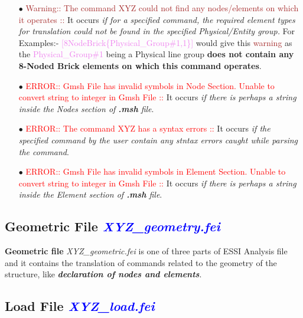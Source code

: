 \documentclass[11pt]{article}
\begin{document}
\begin{itemize}
  \item[$\bullet$]  \textcolor{brown}{Warning::  The  command  XYZ could not
  find any nodes/elements on which it operates :: } 
  It occurs \textit{if for
  a  specified command, the required element types for translation could not
  be   found   in  the  specified  Physical/Entity  group.}  For  Examples:-
  \textcolor{violet}{[8NodeBrick\{Physical\_Group\#1,1\}]}  would  give this
  \textcolor{brown}{warning}  as  the \textcolor{violet}{Physical\_Group\#1}
  being  a  Physical  line  group \textbf{does not contain any 8-Noded Brick
  elements on which this command operates}.
  
  \item[$\bullet$]  \textcolor{red}{ERROR:: Gmsh File has invalid symbols in
  Node  Section.  Unable  to  convert string to integer in Gmsh File :: } 
  It
  occurs  \textit{if  there  is perhaps a string inside the Nodes section of
  \textbf{.msh} file}.
  
  \item[$\bullet$]  \textcolor{red}{ERROR::  The  command  XYZ  has a syntax
  errors :: } 
  It occurs \textit{if the specified command by the user contain
  any stntax errors caught while parsing the command}.
  
  \item[$\bullet$]  \textcolor{red}{ERROR:: Gmsh File has invalid symbols in
  Element  Section. Unable to convert string to integer in Gmsh File :: } 
  It occurs  \textit{if there is perhaps a string inside the Element section of
  \textbf{.msh} file}.

\end{itemize}

\subsection{Geometric File \textcolor{blue}{\textit{XYZ\_geometry.fei}}}

\textbf{Geometric file} \textit{XYZ\_geometric.fei} is one of three parts of
ESSI Analysis file and it contains the translation of commands related to the
geometry of the structure, like \textbf{\textit{declaration of nodes and elements}}.

\subsection{Load File \textcolor{blue}{\textit{XYZ\_load.fei}}}
\end{document}

